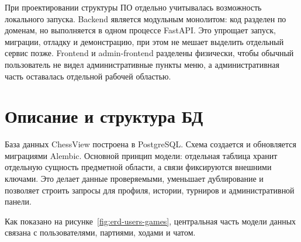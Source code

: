 При проектировании структуры ПО отдельно учитывалась возможность локального запуска. Backend является модульным монолитом: код разделен по доменам, но выполняется в одном процессе FastAPI. Это упрощает запуск, миграции, отладку и демонстрацию, при этом не мешает выделить отдельный сервис позже. Frontend и admin-frontend разделены физически, чтобы обычный пользователь не видел административные пункты меню, а административная часть оставалась отдельной рабочей областью.

\section{Описание и структура БД}

База данных ChessView построена в PostgreSQL. Схема создается и обновляется миграциями Alembic. Основной принцип модели: отдельная таблица хранит отдельную сущность предметной области, а связи фиксируются внешними ключами. Это делает данные проверяемыми, уменьшает дублирование и позволяет строить запросы для профиля, истории, турниров и административной панели.


Как показано на рисунке~\ref{fig:erd-users-games}, центральная часть модели данных связана с пользователями, партиями, ходами и чатом.

